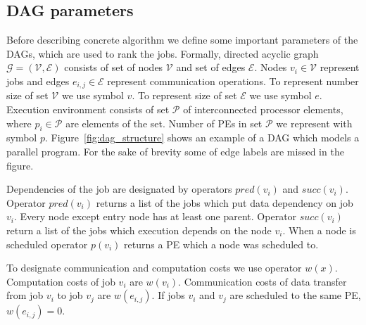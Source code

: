 


\subsection{DAG parameters}
\label{sec:parameters}

Before describing concrete algorithm we define some important
parameters of the DAGs, which are used to rank the jobs. Formally,
directed acyclic graph $\mathcal{G}=(\mathcal{V}, \mathcal{E})$
consists of set of nodes $\mathcal{V}$ and set of edges
$\mathcal{E}$. Nodes $v_i \in \mathcal{V}$ represent jobs and edges
$e_{i, j} \in \mathcal{E}$ represent communication operations. To
represent number size of set $\mathcal{V}$ we use symbol $v$. To
represent size of set $\mathcal{E}$ we use symbol $e$. Execution
environment consists of set $\mathcal{P}$ of interconnected processor
elements, where $p_i \in \mathcal{P}$ are elements of the set. Number
of PEs in set $\mathcal{P}$ we represent with symbol
$p$. Figure~\ref{fig:dag_structure} shows an example of a DAG which
models a parallel program. For the sake of brevity some of edge labels
are missed in the figure.

Dependencies of the job are designated by operators $pred(v_i)$ and
$succ(v_i)$. Operator $pred(v_i)$ returns a list of the jobs which put
data dependency on job $v_i$. Every node except entry node has at
least one parent. Operator $succ(v_i)$ return a list of the jobs which
execution depends on the node $v_i$. When a node is scheduled operator
$p(v_i)$ returns a PE which a node was scheduled to.

To designate communication and computation costs we use operator
$w(x)$. Computation costs of job $v_i$ are $w(v_i)$. Communication
costs of data transfer from job $v_i$ to job $v_j$ are $w(e_{i, j})$.
If jobs $v_i$ and $v_j$ are scheduled to the same PE,
$w(e_{i, j}) = 0$.


